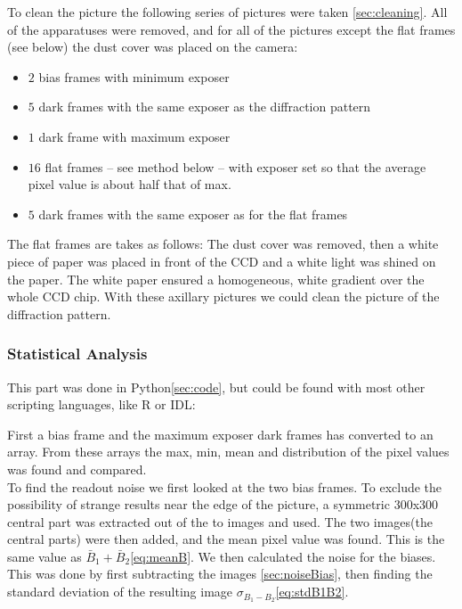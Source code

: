 \documentclass{emulateapj}
\begin{document}
To clean the picture the following series of pictures were taken \ref{sec:cleaning}. All of the apparatuses were removed, and for all of the pictures except the flat frames (see below) the dust cover was placed on the camera: \\


\begin{itemize}
\item $2$ bias frames with minimum exposer
\item $5$ dark frames with the same exposer as the diffraction pattern
\item $1$ dark frame with maximum exposer
\item $16$ flat frames -- see method below -- with exposer set so that the average pixel value is about half that of max.
\item $5$ dark frames with the same exposer as for the flat frames
\end{itemize}

The flat frames are takes as follows: The dust cover was removed, then a white piece of paper was placed in front of the CCD and a white light was shined on the paper. The white paper ensured a homogeneous, white gradient over the whole CCD chip. With these axillary pictures we could clean the picture of the diffraction pattern.

\subsubsection{Statistical Analysis}
This part was done in Python\ref{sec:code}, but could be found with most other scripting languages, like R or IDL:

First a bias frame and the maximum exposer dark frames has converted to an array. From these arrays the max, min, mean and distribution of the pixel values was found and compared. \\

To find the readout noise we first looked at the two bias frames. To exclude the possibility of strange results near the edge of the picture, a symmetric $300$x$300$ central part was extracted out of the to images and used. The two  images(the central parts) were then added, and the mean pixel value was found. This is the same value as $\bar{B}_1 + \bar{B}_2$\eqref{eq:meanB}. We then calculated the noise for the biases. This was done by first subtracting the images \ref{sec:noiseBias}, then finding the standard deviation of the resulting image $\sigma_{B_1 - B_2}$\eqref{eq:stdB1B2}.
\end{document}
